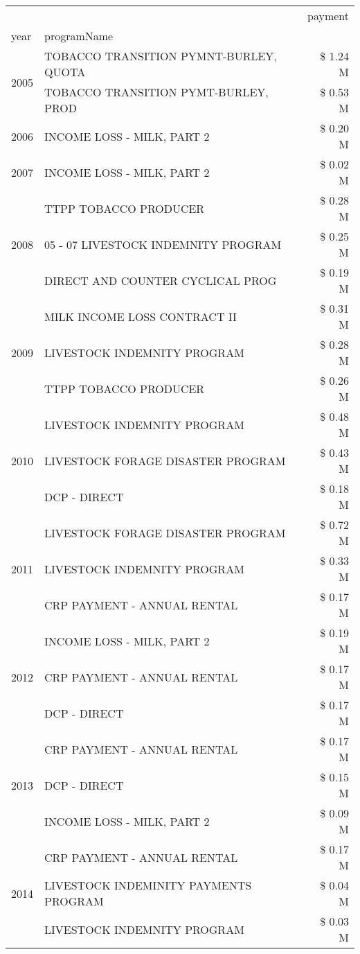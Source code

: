 \begin{tabular}{llr}
\toprule
 &  & payment \\
year & programName &  \\
\midrule
\multirow[t]{2}{*}{2005} & TOBACCO TRANSITION PYMNT-BURLEY, QUOTA & \$ 1.24 M \\
 & TOBACCO TRANSITION PYMT-BURLEY, PROD & \$ 0.53 M \\
\cline{1-3}
2006 & INCOME LOSS - MILK, PART 2 & \$ 0.20 M \\
\cline{1-3}
2007 & INCOME LOSS - MILK, PART 2 & \$ 0.02 M \\
\cline{1-3}
\multirow[t]{3}{*}{2008} & TTPP TOBACCO PRODUCER & \$ 0.28 M \\
 & 05 - 07 LIVESTOCK INDEMNITY PROGRAM & \$ 0.25 M \\
 & DIRECT AND COUNTER CYCLICAL PROG & \$ 0.19 M \\
\cline{1-3}
\multirow[t]{3}{*}{2009} & MILK INCOME LOSS CONTRACT II & \$ 0.31 M \\
 & LIVESTOCK INDEMNITY PROGRAM & \$ 0.28 M \\
 & TTPP TOBACCO PRODUCER & \$ 0.26 M \\
\cline{1-3}
\multirow[t]{3}{*}{2010} & LIVESTOCK INDEMNITY PROGRAM & \$ 0.48 M \\
 & LIVESTOCK FORAGE DISASTER PROGRAM & \$ 0.43 M \\
 & DCP - DIRECT & \$ 0.18 M \\
\cline{1-3}
\multirow[t]{3}{*}{2011} & LIVESTOCK FORAGE DISASTER PROGRAM & \$ 0.72 M \\
 & LIVESTOCK INDEMNITY PROGRAM & \$ 0.33 M \\
 & CRP PAYMENT - ANNUAL RENTAL & \$ 0.17 M \\
\cline{1-3}
\multirow[t]{3}{*}{2012} & INCOME LOSS - MILK, PART 2 & \$ 0.19 M \\
 & CRP PAYMENT - ANNUAL RENTAL & \$ 0.17 M \\
 & DCP - DIRECT & \$ 0.17 M \\
\cline{1-3}
\multirow[t]{3}{*}{2013} & CRP PAYMENT - ANNUAL RENTAL & \$ 0.17 M \\
 & DCP - DIRECT & \$ 0.15 M \\
 & INCOME LOSS - MILK, PART 2 & \$ 0.09 M \\
\cline{1-3}
\multirow[t]{3}{*}{2014} & CRP PAYMENT - ANNUAL RENTAL & \$ 0.17 M \\
 & LIVESTOCK INDEMINITY PAYMENTS PROGRAM & \$ 0.04 M \\
 & LIVESTOCK INDEMNITY PROGRAM & \$ 0.03 M \\

\end{tabular}
